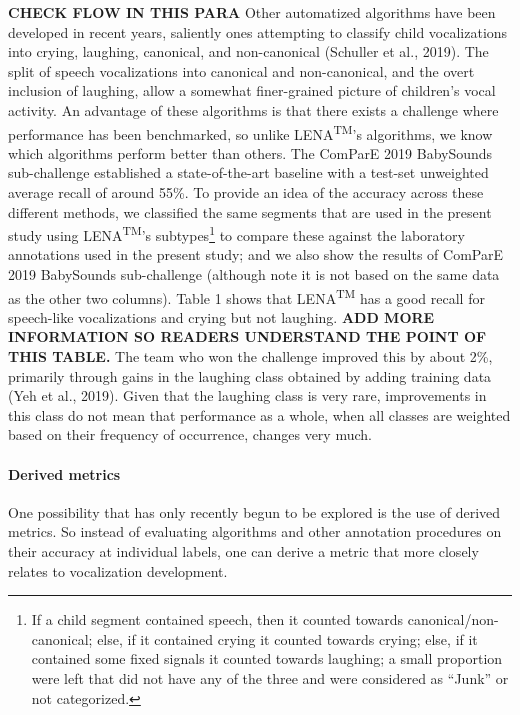 \documentclass[english,,man]{apa6}
\begin{document}
\textbf{CHECK FLOW IN THIS PARA} Other automatized algorithms have been developed in recent years, saliently ones attempting to classify child vocalizations into crying, laughing, canonical, and non-canonical (Schuller et al., 2019). The split of speech vocalizations into canonical and non-canonical, and the overt inclusion of laughing, allow a somewhat finer-grained picture of children's vocal activity. An advantage of these algorithms is that there exists a challenge where performance has been benchmarked, so unlike LENA\textsuperscript{TM}'s algorithms, we know which algorithms perform better than others. The ComParE 2019 BabySounds sub-challenge established a state-of-the-art baseline with a test-set unweighted average recall of around 55\%. To provide an idea of the accuracy across these different methods, we classified the same segments that are used in the present study using LENA\textsuperscript{TM}'s subtypes\footnote{If a child segment contained speech, then it counted towards canonical/non-canonical; else, if it contained crying it counted towards crying; else, if it contained some fixed signals it counted towards laughing; a small proportion were left that did not have any of the three and were considered as \enquote{Junk} or not categorized.} to compare these against the laboratory annotations used in the present study; and we also show the results of ComParE 2019 BabySounds sub-challenge (although note it is not based on the same data as the other two columns). Table 1 shows that LENA\textsuperscript{TM} has a good recall for speech-like vocalizations and crying but not laughing. \textbf{ADD MORE INFORMATION SO READERS UNDERSTAND THE POINT OF THIS TABLE.} The team who won the challenge improved this by about 2\%, primarily through gains in the laughing class obtained by adding training data (Yeh et al., 2019). Given that the laughing class is very rare, improvements in this class do not mean that performance as a whole, when all classes are weighted based on their frequency of occurrence, changes very much.

\hypertarget{derived-metrics}{%
\paragraph{Derived metrics}\label{derived-metrics}}

One possibility that has only recently begun to be explored is the use of derived metrics. So instead of evaluating algorithms and other annotation procedures on their accuracy at individual labels, one can derive a metric that more closely relates to vocalization development.
\end{document}
